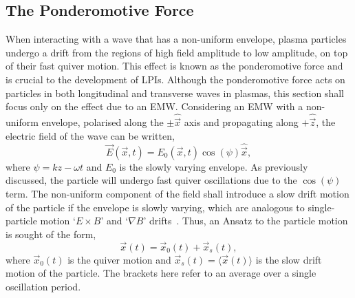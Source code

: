 \subsection{The Ponderomotive Force}%
\label{sec:theory_ponderomotive }

When interacting with a wave that has a non-uniform envelope, plasma particles undergo a drift from the regions of high field amplitude to low amplitude, on top of their fast quiver motion.
This effect is known as the ponderomotive force and is crucial to the development of \ac{LPIs}.
Although the ponderomotive force acts on particles in both longitudinal and transverse waves in plasmas, this section shall focus only on the effect due to an \ac{EMW}.
Considering an \ac{EMW} with a non-uniform envelope, polarised along the $\pm \hat{\vec{x}}$ axis and propagating along $+\hat{\vec{z}}$, the electric field of the wave can be written,
\begin{equation}
    \vec{E}(\vec{x},t) = E_0(\vec{x},t)\cos{(\psi)}\hat{\vec{x}},
\end{equation}
where $\psi = kz - \omega t$ and $E_0$ is the slowly varying envelope.
As previously discussed, the particle will undergo fast quiver oscillations due to the $\cos{(\psi)}$ term.
The non-uniform component of the field shall introduce a slow drift motion of the particle if the envelope is slowly varying, which are analogous to single-particle motion `$E\times B$' and `$\nabla B$' drifts~\cite{chen_introduction_2018}.
Thus, an Ansatz to the particle motion is sought of the form,
\begin{equation}
    \label{eq:theory_ponder_ansatz}
    \vec{x}(t) = \vec{x}_0(t) + \vec{x}_s(t),
\end{equation}
where $\vec{x}_0(t)$ is the quiver motion and $\vec{x}_s(t)=\langle\vec{x}(t)\rangle$ is the slow drift motion of the particle.
The brackets here refer to an average over a single oscillation period.

